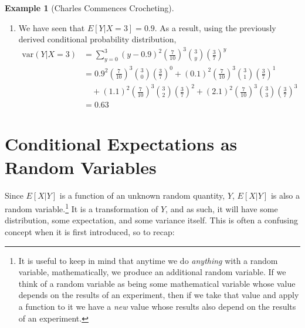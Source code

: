 \documentclass[
  letterpaper,
  DIV=11,
  numbers=noendperiod]{scrreprt}
\theoremstyle{definition}
\theoremstyle{definition}
\newtheorem{example}{Example}[chapter]
\theoremstyle{definition}
\theoremstyle{remark}
\begin{document}
\begin{example}[Charles Commences
Crocheting]
\begin{tcolorbox}[enhanced jigsaw, colback=white, colframe=quarto-callout-color-frame, arc=.35mm, leftrule=.75mm, rightrule=.15mm, opacityback=0, breakable, bottomrule=.15mm, left=2mm, toprule=.15mm]
\begin{enumerate}
\begin{align*}
  &= \frac{3x}{10}\sum_{y=1}^x \binom{x-1}{y-1}\left(\frac{7}{10}\right)^{x-1}\left(\frac{3}{7}\right)^{y-1} \\
  &= \frac{3x}{10}\sum_{k=0}^{r} \binom{r}{k}\left(\frac{7}{10}\right)^r\left(\frac{3}{7}\right)^{k} \\
  &= \frac{3x}{10}\sum_{k=0}^{r} p_{Y|X}(k|r) \\
  &= \frac{3x}{10}.
  \end{align*}
\item
  We have seen that \(E[Y|X=3] = 0.9\). As a result, using the
  previously derived conditional probability distribution,
  \begin{align*}
   \text{var}(Y|X=3) &= \sum_{y=0}^3 (y-0.9)^2\left(\frac{7}{10}\right)^3\binom{3}{y}\left(\frac{3}{7}\right)^y \\
   &= 0.9^2\left(\frac{7}{10}\right)^3\binom{3}{0}\left(\frac{3}{7}\right)^0 + (0.1)^2\left(\frac{7}{10}\right)^3\binom{3}{1}\left(\frac{3}{7}\right)^1 \\
   &\quad + (1.1)^2\left(\frac{7}{10}\right)^3\binom{3}{2}\left(\frac{3}{7}\right)^2 + (2.1)^2\left(\frac{7}{10}\right)^3\binom{3}{3}\left(\frac{3}{7}\right)^3 \\
   &= 0.63
  \end{align*}
\end{enumerate}

\end{tcolorbox}

\end{example}

\section{Conditional Expectations as Random
Variables}\label{conditional-expectations-as-random-variables}

Since \(E[X|Y]\) is a function of an unknown random quantity, \(Y\),
\(E[X|Y]\) is also a random variable.\footnote{It is useful to keep in
  mind that anytime we do \emph{anything} with a random variable,
  mathematically, we produce an additional random variable. If we think
  of a random variable as being some mathematical variable whose value
  depends on the results of an experiment, then if we take that value
  and apply a function to it we have a \emph{new} value whose results
  also depend on the results of an experiment.} It is a transformation
of \(Y\), and as such, it will have some distribution, some expectation,
and some variance itself. This is often a confusing concept when it is
first introduced, so to recap:
\end{document}
